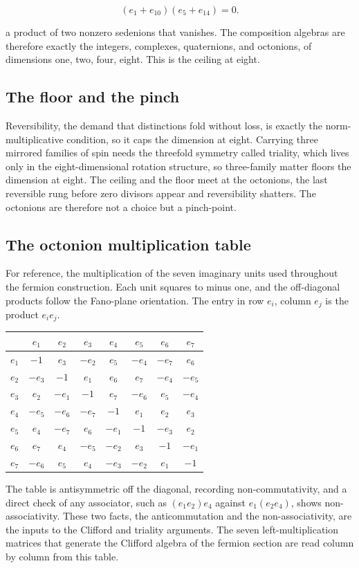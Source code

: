 \[ (e_1 + e_{10})(e_5 + e_{14}) = 0. \]

a product of two nonzero sedenions that vanishes. The composition algebras are therefore exactly the integers, complexes, quaternions, and octonions, of dimensions one, two, four, eight. This is the ceiling at eight.

\subsection*{The floor and the pinch}

Reversibility, the demand that distinctions fold without loss, is exactly the norm-multiplicative condition, so it caps the dimension at eight. Carrying three mirrored families of spin needs the threefold symmetry called triality, which lives only in the eight-dimensional rotation structure, so three-family matter floors the dimension at eight. The ceiling and the floor meet at the octonions, the last reversible rung before zero divisors appear and reversibility shatters. The octonions are therefore not a choice but a pinch-point.

\subsection*{The octonion multiplication table}

For reference, the multiplication of the seven imaginary units used throughout the fermion construction. Each unit squares to minus one, and the off-diagonal products follow the Fano-plane orientation. The entry in row $e_i$, column $e_j$ is the product $e_i e_j$.

\begin{center}
\begin{tabular}{c|ccccccc}
 & $e_1$ & $e_2$ & $e_3$ & $e_4$ & $e_5$ & $e_6$ & $e_7$ \\
\hline
$e_1$ & $-1$ & $e_3$ & $-e_2$ & $e_5$ & $-e_4$ & $-e_7$ & $e_6$ \\
$e_2$ & $-e_3$ & $-1$ & $e_1$ & $e_6$ & $e_7$ & $-e_4$ & $-e_5$ \\
$e_3$ & $e_2$ & $-e_1$ & $-1$ & $e_7$ & $-e_6$ & $e_5$ & $-e_4$ \\
$e_4$ & $-e_5$ & $-e_6$ & $-e_7$ & $-1$ & $e_1$ & $e_2$ & $e_3$ \\
$e_5$ & $e_4$ & $-e_7$ & $e_6$ & $-e_1$ & $-1$ & $-e_3$ & $e_2$ \\
$e_6$ & $e_7$ & $e_4$ & $-e_5$ & $-e_2$ & $e_3$ & $-1$ & $-e_1$ \\
$e_7$ & $-e_6$ & $e_5$ & $e_4$ & $-e_3$ & $-e_2$ & $e_1$ & $-1$ \\
\end{tabular}
\end{center}

The table is antisymmetric off the diagonal, recording non-commutativity, and a direct check of any associator, such as $(e_1 e_2) e_4$ against $e_1 (e_2 e_4)$, shows non-associativity. These two facts, the anticommutation and the non-associativity, are the inputs to the Clifford and triality arguments. The seven left-multiplication matrices that generate the Clifford algebra of the fermion section are read column by column from this table.
